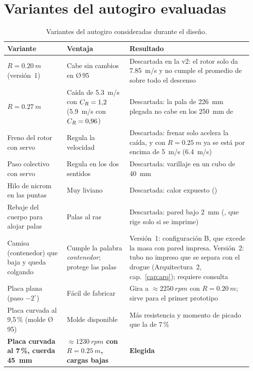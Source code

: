 \section{Variantes del autogiro evaluadas}
\begin{table}[H]
\centering\small
\caption{Variantes del autogiro consideradas durante el diseño.}\label{tab:variantes}
\begin{tabularx}{\textwidth}{@{}lYY@{}}
\toprule
\textbf{Variante} & \textbf{Ventaja} & \textbf{Resultado}\\\midrule
$R=\SI{0.20}{m}$ (versión~1) & Cabe sin cambios en Ø\,95 & Descartada en la v2: el rotor solo da \SI{7.85}{m/s} y no cumple el promedio de  sobre todo el descenso\\
$R=\SI{0.27}{m}$ & Caída de \SI{5.3}{m/s} con $C_{R}=1{,}2$ (\SI{5.9}{m/s} con $C_{R}=0{,}96$) & Descartada: la pala de \SI{226}{mm} plegada no cabe en los \SI{250}{mm} de \\
Freno del rotor con servo & Regula la velocidad & Descartada: frenar solo acelera la caída, y con $R=\SI{0.25}{m}$ ya se está por encima de \SI{5}{m/s} (\SI{6.4}{m/s})\\
Paso colectivo con servo & Regula en los dos sentidos & Descartada: varillaje en un cubo de \SI{40}{mm}\\
Hilo de nicrom en las puntas & Muy liviano & Descartada: calor expuesto ()\\
Rebaje del cuerpo para alojar palas & Palas al ras & Descartada: pared bajo \SI{2}{mm} (, que rige solo si se imprime)\\
Camisa (contenedor) que baja y queda colgando & Cumple la palabra \emph{contenedor}; protege las palas & Versión~1: configuración B, que excede la masa con pared impresa. Versión~2: tubo no impreso que se separa con el drogue (Arquitectura~2, cap.~\ref{cap:arq}); requiere consulta\\
Placa plana (paso $-2^\circ$) & Fácil de fabricar & Gira a $\approx\SI{2250}{rpm}$ con $R=\SI{0.20}{m}$; sirve para el primer prototipo\\
Placa curvada al 9,5\,\% (molde Ø\,95) & Molde disponible & Más resistencia y momento de picado que la de 7\,\%\\
\textbf{Placa curvada al 7\,\%, cuerda \SI{45}{mm}} & \textbf{$\approx\SI{1230}{rpm}$ con $R=\SI{0.25}{m}$, cargas bajas} & \textbf{Elegida}\\
\bottomrule
\end{tabularx}
\end{table}
